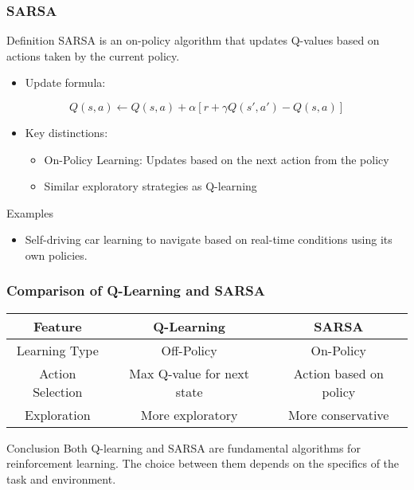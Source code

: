 \documentclass[aspectratio=169]{beamer}
\begin{document}
\begin{frame}[fragile]
    \frametitle{SARSA}

    \begin{block}{Definition}
        SARSA is an on-policy algorithm that updates Q-values based on actions taken by the current policy.
    \end{block}
    
    \begin{itemize}
        \item Update formula:
    \end{itemize}
    
    \begin{equation}
        Q(s, a) \leftarrow Q(s, a) + \alpha [r + \gamma Q(s', a') - Q(s, a)]
    \end{equation}
    
    \begin{itemize}
        \item Key distinctions:
        \begin{itemize}
            \item On-Policy Learning: Updates based on the next action from the policy
            \item Similar exploratory strategies as Q-learning
        \end{itemize}
    \end{itemize}
    
    \begin{block}{Examples}
        \begin{itemize}
            \item Self-driving car learning to navigate based on real-time conditions using its own policies.
        \end{itemize}
    \end{block}
\end{frame}

\begin{frame}[fragile]
    \frametitle{Comparison of Q-Learning and SARSA}

    \begin{center}
        \begin{tabular}{|c|c|c|}
            \hline
            \textbf{Feature} & \textbf{Q-Learning} & \textbf{SARSA} \\
            \hline
            Learning Type & Off-Policy & On-Policy \\
            Action Selection & Max Q-value for next state & Action based on policy \\
            Exploration & More exploratory & More conservative \\
            \hline
        \end{tabular}
    \end{center}

    \begin{block}{Conclusion}
        Both Q-learning and SARSA are fundamental algorithms for reinforcement learning. The choice between them depends on the specifics of the task and environment.
    \end{block}
\end{frame}
\end{document}
